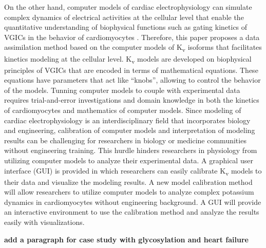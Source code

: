 \documentclass[utf8]{frontiersHLTH} %
\begin{document}
On the other hand, computer models of cardiac electrophysiology can simulate complex dynamics of electrical activities at the cellular level that enable the quantitative understanding of biophysical functions such as gating kinetics of VGICs in the behavior of cardiomyocytes \cite{winslow2011integrative}. Therefore, this paper proposes a data assimilation method based on the computer models of K\textsubscript{v} isoforms that facilitates kinetics modeling at the cellular level. K\textsubscript{v} models are developed on biophysical principles of VGICs that are encoded in terms of mathematical equations. These equations have parameters that act like ``knobs'', allowing to control the behavior of the models. Tunning computer models to couple with experimental data requires trial-and-error investigations and domain knowledge in both the kinetics of cardiomyocytes and mathematics of computer models. Since modeling of cardiac electrophysiology is an interdisciplinary field that incorporates biology and engineering, calibration of computer models and interpretation of modeling results can be challenging for researchers in biology or medicine communities without engineering training. This hurdle hinders researchers in physiology from utilizing computer models to analyze their experimental data. A graphical user interface (GUI) is provided in which researchers can easily calibrate K\textsubscript{v} models to their data and visualize the modeling results. A new model calibration method will allow researchers to utilize computer models to analyze complex potassium dynamics in cardiomyocytes without engineering background. A GUI will provide an interactive environment to use the calibration method and analyze the results easily with visualizations.

\textbf{add a paragraph for case study with glycosylation and heart failure}
\end{document}
